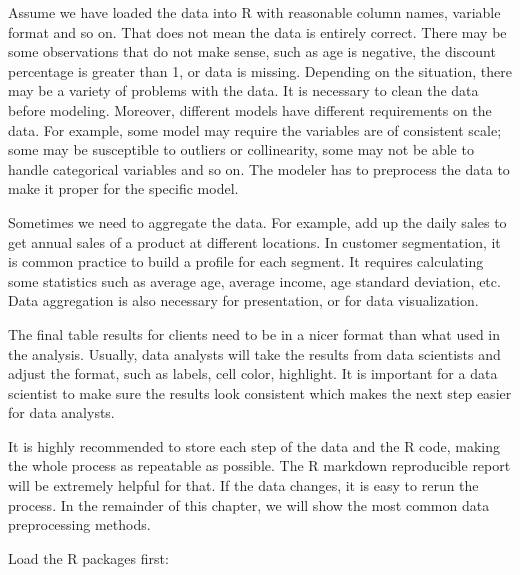 \documentclass[12pt,]{krantz}
\makeatletter
\newenvironment{Shaded}{\begin{snugshade}}{\end{snugshade}}
\newcommand{\CommentTok}[1]{\textcolor[rgb]{0.37,0.37,0.37}{\textit{#1}}}
\newcommand{\ControlFlowTok}[1]{\textcolor[rgb]{0.27,0.27,0.27}{\textbf{#1}}}
\newcommand{\DataTypeTok}[1]{\textcolor[rgb]{0.27,0.27,0.27}{#1}}
\newcommand{\DecValTok}[1]{\textcolor[rgb]{0.06,0.06,0.06}{#1}}
\newcommand{\KeywordTok}[1]{\textcolor[rgb]{0.27,0.27,0.27}{\textbf{#1}}}
\newcommand{\NormalTok}[1]{#1}
\newcommand{\OperatorTok}[1]{\textcolor[rgb]{0.43,0.43,0.43}{\textbf{#1}}}
\newcommand{\OtherTok}[1]{\textcolor[rgb]{0.37,0.37,0.37}{#1}}
\newcommand{\StringTok}[1]{\textcolor[rgb]{0.5,0.5,0.5}{#1}}
\newenvironment{kframe}{%
\medskip{}
\setlength{\fboxsep}{.8em}
 \def\at@end@of@kframe{}%
 \ifinner\ifhmode%
  \def\at@end@of@kframe{\end{minipage}}%
  \begin{minipage}{\columnwidth}%
 \fi\fi%
 \def\FrameCommand##1{\hskip\@totalleftmargin \hskip-\fboxsep
 \colorbox{shadecolor}{##1}\hskip-\fboxsep
     \hskip-\linewidth \hskip-\@totalleftmargin \hskip\columnwidth}%
 \MakeFramed {\advance\hsize-\width
   \@totalleftmargin\z@ \linewidth\hsize
   \@setminipage}}%
 {\par\unskip\endMakeFramed%
 \at@end@of@kframe}
\renewenvironment{Shaded}{\begin{kframe}}{\end{kframe}}
\makeatother
\begin{document}
Assume we have loaded the data into R with reasonable column names, variable format and so on. That does not mean the data is entirely correct. There may be some observations that do not make sense, such as age is negative, the discount percentage is greater than 1, or data is missing. Depending on the situation, there may be a variety of problems with the data. It is necessary to clean the data before modeling. Moreover, different models have different requirements on the data. For example, some model may require the variables are of consistent scale; some may be susceptible to outliers or collinearity, some may not be able to handle categorical variables and so on. The modeler has to preprocess the data to make it proper for the specific model.

Sometimes we need to aggregate the data. For example, add up the daily sales to get annual sales of a product at different locations. In customer segmentation, it is common practice to build a profile for each segment. It requires calculating some statistics such as average age, average income, age standard deviation, etc. Data aggregation is also necessary for presentation, or for data visualization.

The final table results for clients need to be in a nicer format than what used in the analysis. Usually, data analysts will take the results from data scientists and adjust the format, such as labels, cell color, highlight. It is important for a data scientist to make sure the results look consistent which makes the next step easier for data analysts.

It is highly recommended to store each step of the data and the R code, making the whole process as repeatable as possible. The R markdown reproducible report will be extremely helpful for that. If the data changes, it is easy to rerun the process. In the remainder of this chapter, we will show the most common data preprocessing methods.

Load the R packages first:

\begin{Shaded}
\end{Shaded}
\end{document}
